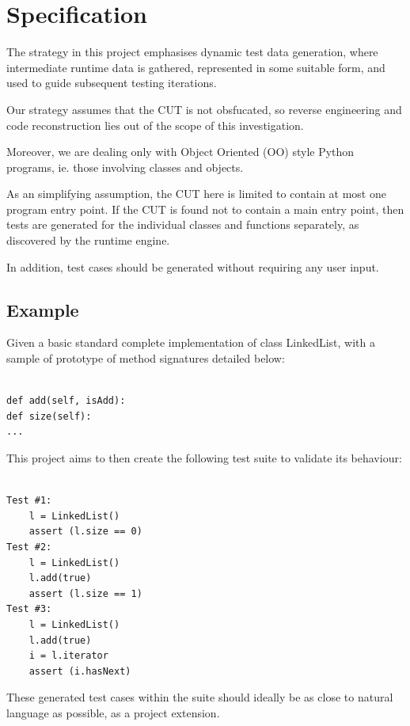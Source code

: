 \documentclass{icldt}
\numberwithin{equation}{section}       %
\begin{document}
\section{Specification}
The strategy in this project emphasises dynamic test data generation, where intermediate runtime data is gathered, represented in some suitable form, and used to guide subsequent testing iterations.

Our strategy assumes that the CUT is not obsfucated, so reverse engineering and code reconstruction lies out of the scope of this investigation.

Moreover, we are dealing only with Object Oriented (OO) style Python programs, ie. those involving classes and objects.

As an simplifying assumption, the CUT here is limited to contain at most one program entry point. If the CUT is found not to contain a main entry point, then tests are generated for the individual classes and functions separately, as discovered by the runtime engine.

In addition, test cases should be generated without requiring any user input.

\subsection*{Example}
Given a basic standard complete implementation of class \textsf{LinkedList}, with a sample of prototype of method signatures detailed below:

\lstset{language=Python}          %
\begin{lstlisting}[frame=single]  % Start your code-block

def add(self, isAdd):
def size(self):
...
\end{lstlisting}

This project aims to then create the following test suite to validate its behaviour:

\begin{lstlisting}[frame=single]  % Start your code-block

Test #1:
	l = LinkedList()
	assert (l.size == 0)
Test #2:
	l = LinkedList()
	l.add(true)
	assert (l.size == 1)
Test #3:
	l = LinkedList()
	l.add(true)
	i = l.iterator
	assert (i.hasNext)
\end{lstlisting}

These generated test cases within the suite should ideally be as close to natural language as possible, as a project extension.
\end{document}
